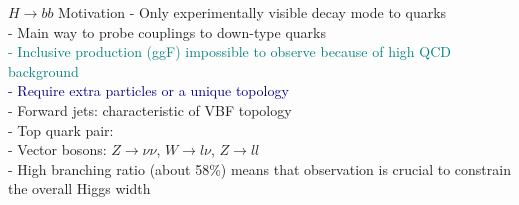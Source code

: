 \documentclass{beamer}
\begin{document}
\begin{frame}{$H\rightarrow bb$ Motivation}
		\textcolor{BrickRed}{- Only experimentally visible decay mode to quarks}\\
		- Main way to probe couplings to down-type quarks \\
		\textcolor{Teal}{- Inclusive production (ggF) impossible to observe because of high QCD background}\\
		\textcolor{Navy}{- Require extra particles or a unique topology}\\
		\vspace{0.2cm}
			\scriptsize{
			\hspace{1cm}	- Forward jets: characteristic of VBF topology\\
			\hspace{1cm}	- Top quark pair: \\
			\hspace{1cm}	- Vector bosons: $Z\rightarrow\nu\nu$, $W\rightarrow l\nu$, $Z\rightarrow ll$\\
			}
		\vspace{0.2cm}
		\normalsize
		\textcolor{BrickRed}{- High branching ratio (about 58\%) means that observation is crucial to constrain the overall Higgs width}

\end{frame}
\end{document}

